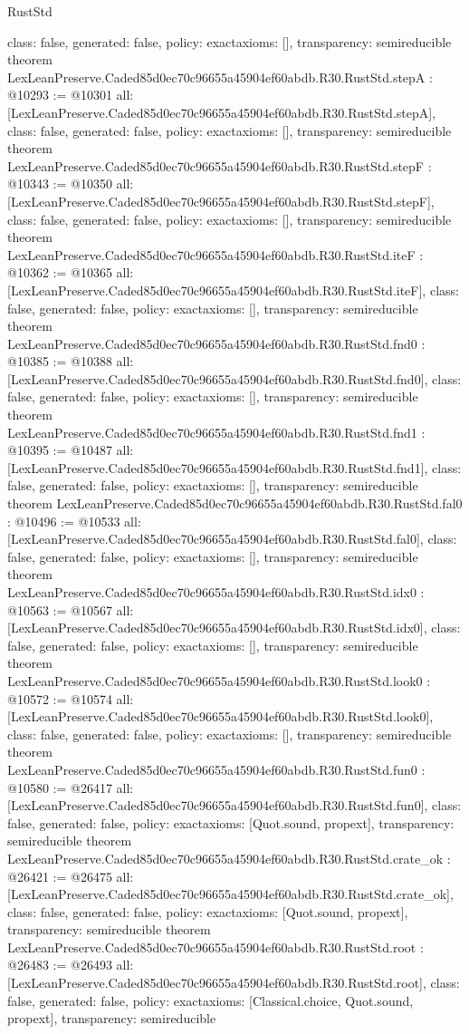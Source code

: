 \begin{lexlean}{RustStd}
\begin{coremodule}
{  class: false,
  generated: false,
  policy: exact{axioms: []},
  transparency: semireducible
}
theorem LexLeanPreserve.Caded85d0ec70c96655a45904ef60abdb.R30.RustStd.stepA : @10293 := @10301 {
  all: [LexLeanPreserve.Caded85d0ec70c96655a45904ef60abdb.R30.RustStd.stepA],
  class: false,
  generated: false,
  policy: exact{axioms: []},
  transparency: semireducible
}
theorem LexLeanPreserve.Caded85d0ec70c96655a45904ef60abdb.R30.RustStd.stepF : @10343 := @10350 {
  all: [LexLeanPreserve.Caded85d0ec70c96655a45904ef60abdb.R30.RustStd.stepF],
  class: false,
  generated: false,
  policy: exact{axioms: []},
  transparency: semireducible
}
theorem LexLeanPreserve.Caded85d0ec70c96655a45904ef60abdb.R30.RustStd.iteF : @10362 := @10365 {
  all: [LexLeanPreserve.Caded85d0ec70c96655a45904ef60abdb.R30.RustStd.iteF],
  class: false,
  generated: false,
  policy: exact{axioms: []},
  transparency: semireducible
}
theorem LexLeanPreserve.Caded85d0ec70c96655a45904ef60abdb.R30.RustStd.fnd0 : @10385 := @10388 {
  all: [LexLeanPreserve.Caded85d0ec70c96655a45904ef60abdb.R30.RustStd.fnd0],
  class: false,
  generated: false,
  policy: exact{axioms: []},
  transparency: semireducible
}
theorem LexLeanPreserve.Caded85d0ec70c96655a45904ef60abdb.R30.RustStd.fnd1 : @10395 := @10487 {
  all: [LexLeanPreserve.Caded85d0ec70c96655a45904ef60abdb.R30.RustStd.fnd1],
  class: false,
  generated: false,
  policy: exact{axioms: []},
  transparency: semireducible
}
theorem LexLeanPreserve.Caded85d0ec70c96655a45904ef60abdb.R30.RustStd.fal0 : @10496 := @10533 {
  all: [LexLeanPreserve.Caded85d0ec70c96655a45904ef60abdb.R30.RustStd.fal0],
  class: false,
  generated: false,
  policy: exact{axioms: []},
  transparency: semireducible
}
theorem LexLeanPreserve.Caded85d0ec70c96655a45904ef60abdb.R30.RustStd.idx0 : @10563 := @10567 {
  all: [LexLeanPreserve.Caded85d0ec70c96655a45904ef60abdb.R30.RustStd.idx0],
  class: false,
  generated: false,
  policy: exact{axioms: []},
  transparency: semireducible
}
theorem LexLeanPreserve.Caded85d0ec70c96655a45904ef60abdb.R30.RustStd.look0 : @10572 := @10574 {
  all: [LexLeanPreserve.Caded85d0ec70c96655a45904ef60abdb.R30.RustStd.look0],
  class: false,
  generated: false,
  policy: exact{axioms: []},
  transparency: semireducible
}
theorem LexLeanPreserve.Caded85d0ec70c96655a45904ef60abdb.R30.RustStd.fun0 : @10580 := @26417 {
  all: [LexLeanPreserve.Caded85d0ec70c96655a45904ef60abdb.R30.RustStd.fun0],
  class: false,
  generated: false,
  policy: exact{axioms: [Quot.sound, propext]},
  transparency: semireducible
}
theorem LexLeanPreserve.Caded85d0ec70c96655a45904ef60abdb.R30.RustStd.crate_ok : @26421 := @26475 {
  all: [LexLeanPreserve.Caded85d0ec70c96655a45904ef60abdb.R30.RustStd.crate_ok],
  class: false,
  generated: false,
  policy: exact{axioms: [Quot.sound, propext]},
  transparency: semireducible
}
theorem LexLeanPreserve.Caded85d0ec70c96655a45904ef60abdb.R30.RustStd.root : @26483 := @26493 {
  all: [LexLeanPreserve.Caded85d0ec70c96655a45904ef60abdb.R30.RustStd.root],
  class: false,
  generated: false,
  policy: exact{axioms: [Classical.choice, Quot.sound, propext]},
  transparency: semireducible
}


\end{coremodule}
\end{lexlean}
